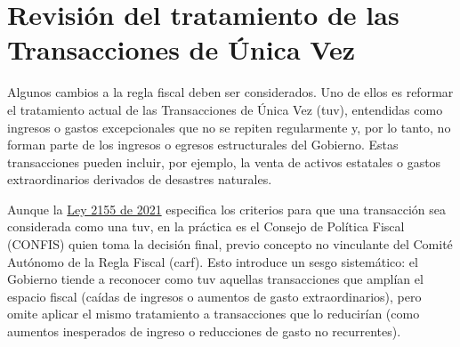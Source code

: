 
\section{Revisión del tratamiento de las Transacciones de Única Vez}

Algunos cambios a la regla fiscal deben ser considerados. Uno de ellos es reformar el tratamiento actual de las Transacciones de Única Vez (\gls{tuv}), entendidas como ingresos o gastos excepcionales que no se repiten regularmente y, por lo tanto, no forman parte de los ingresos o egresos estructurales del Gobierno. Estas transacciones pueden incluir, por ejemplo, la venta de activos estatales o gastos extraordinarios derivados de desastres naturales.

Aunque la \href{https://www.funcionpublica.gov.co/eva/gestornormativo/norma.php?i=170902}{Ley 2155 de 2021} especifica los criterios para que una transacción sea considerada como una \gls{tuv}, en la práctica es el Consejo de Política Fiscal (CONFIS) quien toma la decisión final, previo concepto no vinculante del Comité Autónomo de la Regla Fiscal (\gls{carf}). Esto introduce un sesgo sistemático: el Gobierno tiende a reconocer como \gls{tuv} aquellas transacciones que amplían el espacio fiscal (caídas de ingresos o aumentos de gasto extraordinarios), pero omite aplicar el mismo tratamiento a transacciones que lo reducirían (como aumentos inesperados de ingreso o reducciones de gasto no recurrentes).


